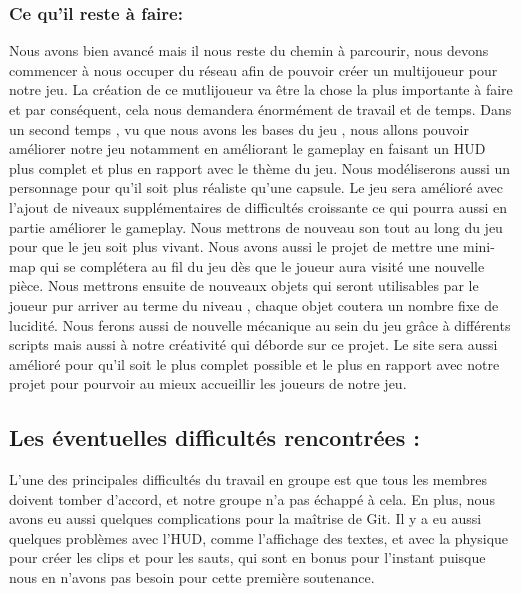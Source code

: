 \documentclass[a4paper]{article}
\begin{document}
\quad
		\subsubsection{Ce qu'il reste à faire:}

\quad

Nous avons bien avancé mais il nous reste du chemin à parcourir, nous devons commencer à nous occuper du réseau afin de pouvoir créer un multijoueur pour notre jeu. La création de ce mutlijoueur va être la chose la plus importante à faire et par conséquent, cela nous demandera énormément de travail et de temps.
Dans un second temps , vu que nous avons les bases du jeu , nous allons pouvoir améliorer notre jeu notamment en améliorant le gameplay en faisant un HUD plus complet et plus en rapport avec le thème du jeu. Nous modéliserons aussi un personnage pour qu’il soit plus réaliste qu’une capsule.
Le jeu sera amélioré avec l’ajout de niveaux supplémentaires de difficultés croissante ce qui pourra aussi en partie améliorer le gameplay.
Nous mettrons de nouveau son tout au long du jeu pour que le jeu soit plus vivant.
Nous avons aussi le projet de mettre une mini-map qui se complétera au fil du jeu dès que le joueur aura visité une nouvelle pièce.
Nous mettrons ensuite de nouveaux objets qui seront utilisables par le joueur pur arriver au terme du niveau , chaque objet coutera un nombre fixe de lucidité.
Nous ferons aussi de nouvelle mécanique au sein du jeu grâce à différents scripts mais aussi à notre créativité qui déborde sur ce projet.
Le site sera aussi amélioré pour qu’il soit le plus complet possible et le plus en rapport avec notre projet pour pourvoir au mieux accueillir les joueurs de notre jeu.


\quad

\newpage

	\subsection{Les éventuelles difficultés rencontrées :}
\quad

    
     L’une des principales difficultés du travail en groupe est que tous les membres doivent tomber d’accord, et notre groupe n’a pas échappé à cela. En plus, nous avons eu aussi quelques complications pour la maîtrise de Git. Il y a eu aussi quelques problèmes avec l’HUD, comme l’affichage des textes, et avec la physique pour créer les clips et pour les sauts, qui sont en bonus pour l’instant puisque nous en n’avons pas besoin pour cette première soutenance.
\end{document}
